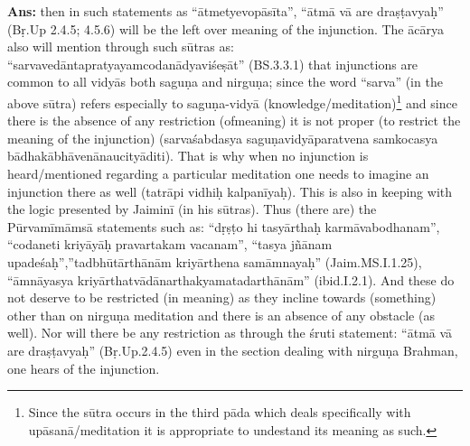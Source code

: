 \textbf{Ans:} then in such statements as “ātmetyevopāsīta”, “ātmā vā are dra\-ṣṭavyaḥ” (Bṛ.Up 2.4.5; 4.5.6) will be the left over meaning of the injunction. The ācārya also will mention through such sūtras as: “sarvavedāntapratyayamcodanādyaviśeṣāt” (BS.3.3.1) that injunctions are common to all vidyās both saguṇa and nirguṇa; since the word “sarva” (in the above sūtra) refers especially to saguṇa-vidyā (knowledge/\-meditation)\footnote{Since the sūtra occurs in the third pāda which deals specifically with upāsanā/\-meditation it is appropriate to undestand its meaning as such.} and since there is the absence of any restriction (of\break meaning) it is not proper (to restrict the meaning of the injunction) (sarvaśabdasya saguṇavidyāparatvena samkocasya bādhakābhāvenānaucityāditi). That is why when no injunction is heard/mentioned regarding a particular meditation one needs to imagine an injunction there as well (tatrāpi vidhiḥ kalpanīyaḥ). This is also in keeping with the logic presented by Jaiminī (in his sūtras). Thus (there are) the  Pūrvamīmāmsā statements such as: “dṛṣṭo hi tasyārthaḥ karmāvabodhanam”, “codaneti kriyāyāḥ pravartakam vacanam”, “tasya jñānam upadeśaḥ”,”tadbhūtārthānām kriyārthena samāmnayaḥ” (Jaim.MS.\break\-I.1.25), “āmnāyasya kriyārthatvādānarthakyamatadarthānām” (ibid.\break\-I.2.1). And these do not deserve to be restricted (in meaning) as they incline towards (something) other than on nirguṇa meditation and there is an absence of any obstacle (as well). Nor will there be any restriction as through the śruti statement: “ātmā vā are draṣṭavyaḥ” (Bṛ.Up.2.4.5) even in the section dealing with nirguṇa Brahman, one hears of the injunction.


